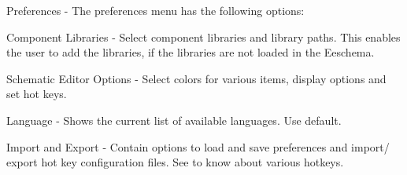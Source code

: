 \begin{compactenum}
\item Preferences - 
The preferences menu has the following options:
\begin{compactenum}
\item Component Libraries - Select component libraries and library paths. This enables the user to add the libraries, if the libraries are not loaded in the Eeschema.
\item Schematic Editor Options - Select colors for various items, display 
options and set hot keys.
\item Language - Shows the current list of available languages. Use default. 
\item Import and Export - Contain options to load and save preferences and 
import/ export hot key configuration files. See  to know about 
various hotkeys.
\end{compactenum}

\end{compactenum} 

